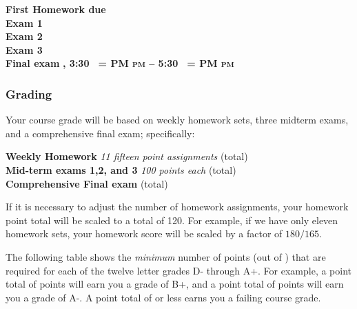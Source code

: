 \documentclass[12pt]{article}
\makeatletter
\newcounter{ex}\setcounter{ex}{0}
\newenvironment{mypar}[2]
  {\begin{list}{}%
    {\setlength\leftmargin{#1}
    \setlength\rightmargin{#2}}
    \item[]}
  {\end{list}}
\DeclareRobustCommand{\maybefakesc}[1]{%
  \ifnum\pdfstrcmp{\f@series}{\bfdefault}=\z@
    {\fontsize{\dimexpr0.8\dimexpr\f@size pt\relax}{0}\selectfont\uppercase{#1}}%
  \else
    \textsc{#1}%
  \fi
}
\newcommand\PM{\,\maybefakesc{pm}\xspace}
\makeatother
\begin{document}
\begin{mypar}{0.25in}{0.25in} 

      \textbf{First Homework due} \dotfill  \textbf{}  \\
       \textbf{Exam 1} \dotfill \textbf{}  \\
    \textbf{Exam 2} \dotfill  \textbf{} \\
    \textbf{Exam 3} \dotfill \textbf{} \\
      \textbf{Final exam} \dotfill  \textbf{, 3:30 \PM  --  5:30 \PM}
\end{mypar}



\subsubsection*{Grading}

Your course grade will be based on weekly homework sets, three midterm exams, and a comprehensive 
final exam; specifically:
\begin{mypar}{0.25in}{0.25in}
    \textbf{Weekly Homework}  \emph{11 fifteen point assignments}   (total) \\
    \textbf{Mid-term exams 1,2, and 3} \emph{100 points each}  (total)\\
      \textbf{Comprehensive Final exam}  (total)
\end{mypar}
If it is necessary to adjust the number of  homework assignments,  your homework point 
total will be scaled to a total of 120.  For example, if we have only eleven homework sets, 
your homework score will be scaled by a factor of \(180/165\).





The following table shows the \emph{minimum} number of points (out of \points) that
are required for each of the twelve letter grades D- through A+. For
example, a point total of \Bp\/  points will earn you a grade of B+,  and 
a point total of \Am\/ points will earn you a grade of A-. A point
total of \F\/  or less earns you a failing course grade.
 
\end{document}
